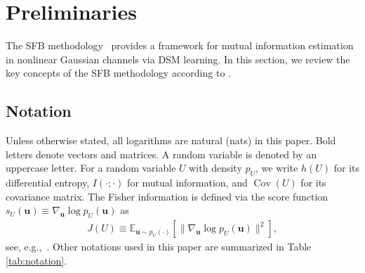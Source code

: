 \documentclass[conference]{IEEEtran}
\newcommand{\Yt}{Y_t}
\begin{document}




\section{Preliminaries}
\label{sec:preliminaries}

The SFB methodology~\cite{wadayama2025} provides 
a framework for mutual information estimation in nonlinear Gaussian channels 
via DSM learning. In this section, we review 
the key concepts of the SFB methodology according to \cite{wadayama2025}.

\subsection{Notation}

Unless otherwise stated, all logarithms are natural (nats) in this paper.
Bold letters denote vectors and matrices.
A random variable is denoted by an uppercase letter. 
For a random variable $U$ with density $p_U$, we write $h(U)$ for 
its differential entropy, $I(\cdot;\cdot)$ for mutual information, 
and $\operatorname{Cov}(U)$ for its covariance matrix. 
The Fisher information is defined via the score function 
$s_U(\bm u)\equiv\nabla_{\bm u}\log p_U(\bm u)$ as
\begin{align}
J(U)\equiv \mathbb{E}_{\bm u\sim p_U(\cdot)}\!\left[\|\nabla_{\bm u}\log p_U(\bm u)\|^2\right],
\end{align}
see, e.g.,~\cite{fisher1922,cover2006}.
Other notations used in this paper are summarized in Table \ref{tab:notation}.
\end{document}
